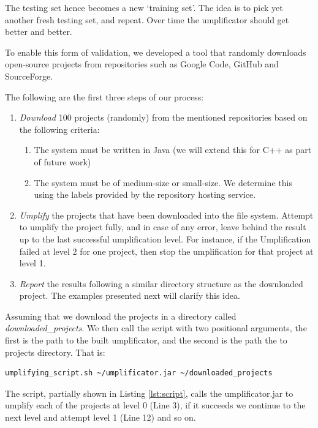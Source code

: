 The testing set hence becomes a new `training set'. The idea is to pick yet another fresh testing set, and repeat. Over time the umplificator should get better and better.

To enable this form of validation, we developed a tool that randomly downloads open-source projects from repositories such as Google Code, GitHub and SourceForge.

The following are the first three steps of our process:

\begin{enumerate}
\item \textit{Download} 100 projects (randomly) from the mentioned repositories based on the following criteria: 
	\begin{enumerate}
	\item The system must be written in Java (we will extend this for C++ as part of future work)
	\item The system must be of medium-size or small-size. We determine this using the labels provided by the repository hosting service.
	\end{enumerate}
\item \textit{Umplify} the projects that have been downloaded into the file system. Attempt to umplify the project fully, and in case of any error, leave behind the result up to the last successful umplification level. For instance, if the Umplification failed at level 2 for one project, then stop the umplification for that project at level 1.

\item \textit{Report} the results following a similar directory structure as the downloaded project. The examples presented next will clarify this idea.
\end{enumerate}

Assuming that we download the projects in a directory called \textit{downloaded\_projects}. We then call the script with two positional arguments, the first is the path to the built umplificator, and the second is the path the to projects directory. That is:

\vspace{\baselineskip}
\begin{lstlisting}[style=umplePlain]
   umplifying_script.sh ~/umplificator.jar ~/downloaded_projects
\end{lstlisting}

The script, partially shown in Listing \ref{lst:script}, calls the umplificator.jar to umplify each of the projects at level 0 (Line 3), if it succeeds we continue to the next level and attempt level 1 (Line 12) and so on. 


